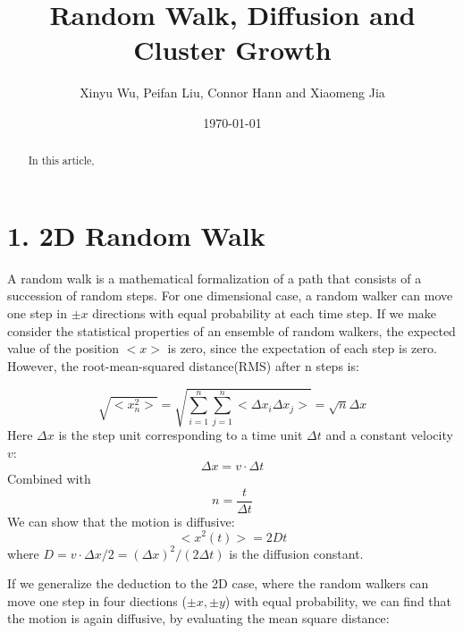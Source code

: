 \documentclass[aps,prl,preprint,superscriptaddress]{revtex4}
\begin{document}
	
	
	\title{Random Walk, Diffusion and Cluster Growth}%
	
	\author{Xinyu Wu, Peifan Liu, Connor Hann and Xiaomeng Jia}
	
	
	\date{\today}
	
	\begin{abstract}
		In this article,  
	\end{abstract}
	
	\maketitle
	
	
	
	\section{1. 2D Random Walk} 
	
	
	A random walk is a mathematical formalization of a path that consists of a succession of random steps. For one dimensional case, a random walker can move one step in $\pm x$ directions with equal probability at each time step. If we make consider the statistical properties of  an ensemble of random walkers, the expected value of the position $ <x> $ is zero, since the expectation of each step is zero. However, the root-mean-squared distance(RMS) after n steps is:
	
	\begin{equation}
	\sqrt{<x_n^2>} = \sqrt{\sum\limits_{i=1}^{n}\sum\limits_{j=1}^{n}<\Delta x_i\Delta x_j>} = \sqrt{n}\Delta x
	\end{equation} 
	Here $\Delta x$ is the step unit corresponding to a time unit $\Delta t$ and a constant velocity $v$:
	\begin{equation}
	\Delta x = v\cdot \Delta t
	\end{equation} 
	Combined with
	\begin{equation}
	n = \frac{t}{\Delta t}
	\end{equation}
	We can show that the motion is diffusive:
	\begin{equation}
	<x^2(t)> = 2Dt
	\end{equation}
	where $D = v\cdot\Delta x/2 = (\Delta x)^2/(2\Delta t)$ is the diffusion constant.
	
	If we generalize the deduction to the 2D case, where the random walkers can move one step in four diections ($\pm x, \pm y$) with equal probability, we can find that the motion is again diffusive, by evaluating the mean square distance:
	
\end{document}
